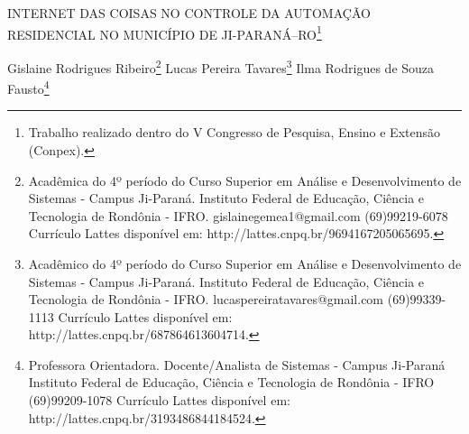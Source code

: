 \documentclass[article,12pt,onesidea,4paper,english,brazil]{abntex2}
\begin{document}
	
	
	\frenchspacing 
	
	\begin{center}
		\LARGE INTERNET DAS COISAS NO CONTROLE DA AUTOMAÇÃO RESIDENCIAL NO MUNICÍPIO DE JI-PARANÁ–RO\footnote{Trabalho realizado dentro do V Congresso de Pesquisa, Ensino e Extensão (Conpex).}
		
		\normalsize
	Gislaine Rodrigues Ribeiro\footnote{Acadêmica do 4º período do Curso Superior em Análise e Desenvolvimento de Sistemas -
		Campus Ji-Paraná. Instituto Federal de Educação, Ciência e Tecnologia de Rondônia - IFRO.
		gislainegemea1@gmail.com (69)99219-6078 Currículo Lattes disponível em:
		http://lattes.cnpq.br/9694167205065695.} 
	Lucas Pereira Tavares\footnote{Acadêmico do 4º período do Curso Superior em Análise e Desenvolvimento de Sistemas -
		Campus Ji-Paraná. Instituto Federal de Educação, Ciência e Tecnologia de Rondônia - IFRO.
		lucaspereiratavares@gmail.com (69)99339-1113 Currículo Lattes disponível em:
		http://lattes.cnpq.br/687864613604714.} 
	Ilma Rodrigues de Souza Fausto\footnote{Professora Orientadora. Docente/Analista de Sistemas - Campus Ji-Paraná
		Instituto Federal de Educação, Ciência e Tecnologia de Rondônia - IFRO
		(69)99209-1078 Currículo Lattes disponível em: http://lattes.cnpq.br/3193486844184524.} 
	\end{center}
	
\end{document}
